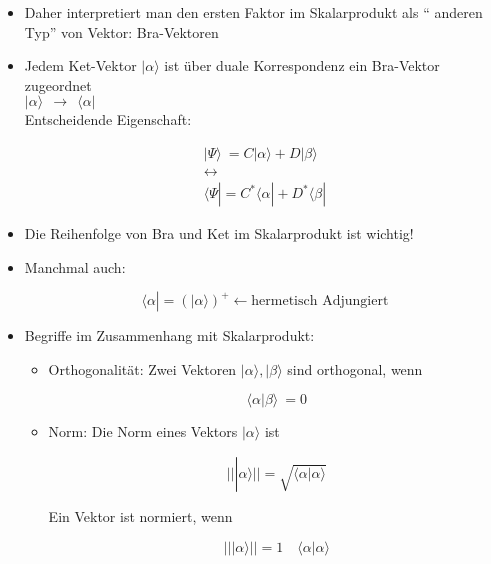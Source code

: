 \documentclass[10pt,article,colorback,accentcolor=tud9d]{scrartcl}
\begin{document}
\begin{itemize}
\item Daher interpretiert man den ersten Faktor im Skalarprodukt als "`
anderen Typ"' von Vektor: Bra-Vektoren
\item Jedem Ket-Vektor $\left|\right.\alpha\rangle $ ist über duale Korrespondenz 
ein Bra-Vektor zugeordnet\\
$\left|\right.\alpha\rangle  \ \ \rightarrow \ \ \langle \alpha\left|\right.$\\
Entscheidende Eigenschaft:
 
\begin{equation}
\begin{aligned}
\left|\right.\Psi\rangle  \ = C \left|\right.\alpha\rangle  +D\left|\right.\beta\rangle \\
\longleftrightarrow\\
\langle \Psi\left|\right.=C^*\langle \alpha\left|\right. +D^* \langle \beta\left|\right.
\end{aligned}
\end{equation}
 
\item Die Reihenfolge von Bra und Ket im Skalarprodukt ist wichtig!
\item Manchmal auch:
 
\begin{equation}
\langle \alpha\left|\right.=(\left|\right.\alpha\rangle )^+ \leftarrow \text{hermetisch 
Adjungiert}
\end{equation}
 
\item Begriffe im Zusammenhang mit Skalarprodukt:
\begin{itemize}
\item Orthogonalität: Zwei Vektoren $\left|\right.\alpha\rangle , \left|\right.\beta\rangle 
$ sind orthogonal, wenn
 
\begin{equation}
\langle \alpha\left|\right.\beta\rangle  \ =0
\end{equation}
 
\item Norm: Die Norm eines Vektors $\left|\right.\alpha\rangle $ ist 
 
\begin{equation}
\left|\right|\left|\right.\alpha\rangle \left|\right|=\sqrt{\langle \alpha\left|\right.
\alpha\rangle }
\end{equation}
 
Ein Vektor ist normiert, wenn
 
\begin{equation}
\left|\right|\left|\right.\alpha\rangle \left|\right| =1 \quad \langle \alpha\left|\right.
\alpha\rangle 
\end{equation}
 

\end{itemize}
\end{itemize}
\end{document}
